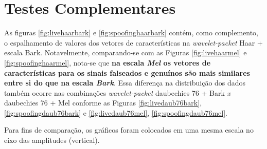 	\section{Testes Complementares}
	\label{chap:testsResults:sec:Experimento05}
		As figuras \ref{fig:livehaarbark} e \ref{fig:spoofinghaarbark} contém, como complemento, o espalhamento de valores dos vetores de características na \textit{wavelet-packet} Haar + escala Bark. Notavelmente, comparando-se com as Figuras \ref{fig:livehaarmel} e \ref{fig:spoofinghaarmel}, nota-se que \textbf{na escala \textit{Mel} os vetores de características para os sinais falseados e genuínos são mais similares entre si do que na escala \textit{Bark}}. Essa diferença na distribuição dos dados também ocorre nas combinações  \textit{wavelet-packet} daubechies 76 + Bark \textit{x} daubechies 76 + Mel conforme as Figuras \ref{fig:livedaub76bark}, \ref{fig:spoofingdaub76bark} e \ref{fig:livedaub76mel}, \ref{fig:spoofingdaub76mel}.
		
		\par Para fins de comparação, os gráficos foram colocados em uma mesma escala no eixo das amplitudes (vertical).
		
		
